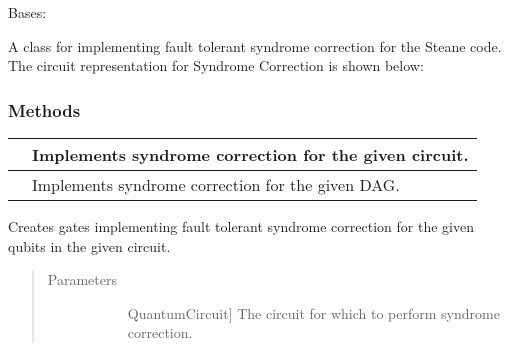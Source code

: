 \documentclass[letterpaper,10pt,english]{sphinxmanual}
\begin{document}
\begin{fulllineitems}
\label{\detokenize{Steane:Steane.SteaneSyndromeCorrector}}
Bases: {\hyperref[\detokenize{Base:BaseFaultTolerance.SyndromeCorrector}]{}}

A class for implementing fault tolerant syndrome correction for the Steane code.
The circuit representation for Syndrome Correction is shown below:

\begin{figure}[htbp]
\centering

\noindent{}
\end{figure}
\subsubsection*{Methods}


\begin{savenotes}\sphinxattablestart
\centering
\begin{tabulary}{\linewidth}[t]{|T|T|}
\hline

&
Implements syndrome correction for the given circuit.
\\
\hline
{}
&
Implements syndrome correction for the given DAG.
\\
\hline
\end{tabulary}
\par
\sphinxattableend\end{savenotes}

\begin{fulllineitems}
\label{\detokenize{Steane:Steane.SteaneSyndromeCorrector.syndromeCorrectCircuit}}
Creates gates implementing fault tolerant syndrome correction for the given qubits in the given circuit.
\begin{quote}\begin{description}
\item[{Parameters}] \leavevmode\begin{description}
\item[{}] \leavevmode{[}QuantumCircuit{]}
The circuit for which to perform syndrome correction.


\end{description}
\end{description}
\end{quote}
\end{fulllineitems}
\end{fulllineitems}
\end{document}
